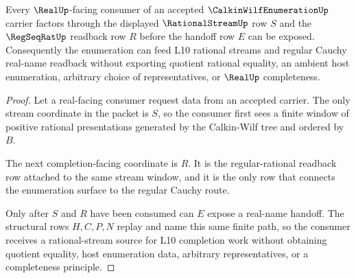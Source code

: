 \begin{theorem}
\label{thm:calkin-wilf-enumeration-real-completion-handoff}
Every $\RealUp$-facing consumer of an accepted
$\CalkinWilfEnumerationUp$ carrier factors through the displayed
$\RationalStreamUp$ row $S$ and the $\RegSeqRatUp$ readback row $R$ before the
handoff row $E$ can be exposed. Consequently the enumeration can feed L10
rational streams and regular Cauchy real-name readback without exporting
quotient rational equality, an ambient host enumeration, arbitrary choice of
representatives, or $\RealUp$ completeness.
\end{theorem}
\begin{proof}
Let a real-facing consumer request data from an accepted carrier. The only
stream coordinate in the packet is $S$, so the consumer first sees a finite
window of positive rational presentations generated by the Calkin-Wilf tree
and ordered by $B$.

The next completion-facing coordinate is $R$. It is the regular-rational
readback row attached to the same stream window, and it is the only row that
connects the enumeration surface to the regular Cauchy route.

Only after $S$ and $R$ have been consumed can $E$ expose a real-name handoff.
The structural rows $H,C,P,N$ replay and name this same finite path, so the
consumer receives a rational-stream source for L10 completion work without
obtaining quotient equality, host enumeration data, arbitrary representatives,
or a completeness principle.
\end{proof}

\begin{closurestatus}{\CalkinWilfEnumerationUp}
  \theoryclosure{\seedClosure}
  \formalstatus{\unformalizedV}
\end{closurestatus}
